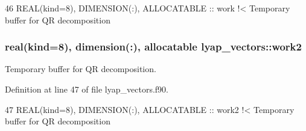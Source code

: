 \begin{DoxyCode}
46   \textcolor{keywordtype}{REAL(kind=8)}, \textcolor{keywordtype}{DIMENSION(:)}, \textcolor{keywordtype}{ALLOCATABLE} :: work\textcolor{comment}{       !< Temporary buffer for QR decomposition}
\end{DoxyCode}
\subsubsection[{\texorpdfstring{work2}{work2}}]{\setlength{\rightskip}{0pt plus 5cm}real(kind=8), dimension(\+:), allocatable lyap\+\_\+vectors\+::work2\hspace{0.3cm}{\ttfamily [private]}}\hypertarget{namespacelyap__vectors_a1575bc16fe4704466132dea4aeb2d067}{}\label{namespacelyap__vectors_a1575bc16fe4704466132dea4aeb2d067}


Temporary buffer for QR decomposition. 



Definition at line 47 of file lyap\+\_\+vectors.\+f90.


\begin{DoxyCode}
47   \textcolor{keywordtype}{REAL(kind=8)}, \textcolor{keywordtype}{DIMENSION(:)}, \textcolor{keywordtype}{ALLOCATABLE} :: work2\textcolor{comment}{      !< Temporary buffer for QR decomposition}
\end{DoxyCode}
